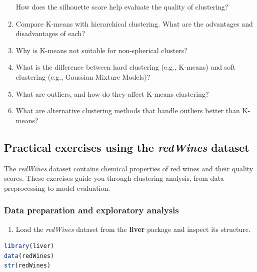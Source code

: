 \documentclass[
  11pt,
]{book}
\providecommand{\tightlist}{%
  \setlength{\itemsep}{0pt}\setlength{\parskip}{0pt}}
\theoremstyle{definition}
\theoremstyle{definition}
\theoremstyle{definition}
\theoremstyle{definition}
\theoremstyle{remark}
\begin{document}
\begin{enumerate}
  How does the silhouette score help evaluate the quality of clustering?\\
\item
  Compare K-means with hierarchical clustering. What are the advantages and disadvantages of each?\\
\item
  Why is K-means not suitable for non-spherical clusters?\\
\item
  What is the difference between hard clustering (e.g., K-means) and soft clustering (e.g., Gaussian Mixture Models)?\\
\item
  What are outliers, and how do they affect K-means clustering?\\
\item
  What are alternative clustering methods that handle outliers better than K-means?
\end{enumerate}

\subsection*{\texorpdfstring{Practical exercises using the \emph{redWines} dataset}{Practical exercises using the redWines dataset}}\label{practical-exercises-using-the-redwines-dataset-1}


The \emph{redWines} dataset contains chemical properties of red wines and their quality scores. These exercises guide you through clustering analysis, from data preprocessing to model evaluation.

\subsubsection*{Data preparation and exploratory analysis}\label{data-preparation-and-exploratory-analysis}


\begin{enumerate}
\def\labelenumi{\arabic{enumi}.}
\setcounter{enumi}{20}
\tightlist
\item
  Load the \emph{redWines} dataset from the \textbf{liver} package and inspect its structure.\\
\end{enumerate}

\begin{lstlisting}[language=R]
library(liver)
data(redWines)
str(redWines)
\end{lstlisting}
\end{document}
